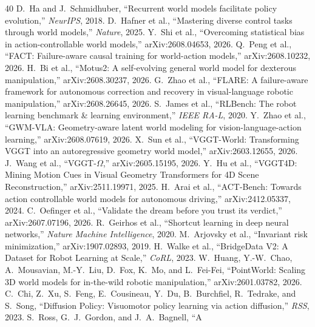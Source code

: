 \documentclass[conference]{IEEEtran}
\begin{document}

\begin{thebibliography}{40}
 D.~Ha and J.~Schmidhuber, ``Recurrent world models
facilitate policy evolution,'' \emph{NeurIPS}, 2018.
 D.~Hafner et al., ``Mastering diverse control
tasks through world models,'' \emph{Nature}, 2025.
 Y.~Shi et al., ``Overcoming statistical bias in
action-controllable world models,'' arXiv:2608.04653, 2026.
 Q.~Peng et al., ``FACT: Failure-aware causal training for
world-action models,'' arXiv:2608.10232, 2026.
 H.~Bi et al., ``Motus2: A self-evolving general world
model for dexterous manipulation,'' arXiv:2608.30237, 2026.
 G.~Zhao et al., ``FLARE: A failure-aware framework for
autonomous correction and recovery in visual-language robotic manipulation,''
arXiv:2608.26645, 2026.
 S.~James et al., ``RLBench: The robot learning benchmark
\& learning environment,'' \emph{IEEE RA-L}, 2020.
 Y.~Zhao et al., ``GWM-VLA: Geometry-aware latent world
modeling for vision-language-action learning,'' arXiv:2608.07619, 2026.
 X.~Sun et al., ``VGGT-World: Transforming VGGT into an
autoregressive geometry world model,'' arXiv:2603.12655, 2026.
 J.~Wang et al., ``VGGT-$\Omega$,'' arXiv:2605.15195,
2026.
 Y.~Hu et al., ``VGGT4D: Mining Motion Cues in Visual
Geometry Transformers for 4D Scene Reconstruction,'' arXiv:2511.19971, 2025.
 H.~Arai et al., ``ACT-Bench: Towards action controllable
world models for autonomous driving,'' arXiv:2412.05337, 2024.
 C.~Oefinger et al., ``Validate the dream before you
trust its verdict,'' arXiv:2607.07196, 2026.
 R.~Geirhos et al., ``Shortcut learning in deep
neural networks,'' \emph{Nature Machine Intelligence}, 2020.
 M.~Arjovsky et al., ``Invariant risk minimization,''
arXiv:1907.02893, 2019.
 H.~Walke et al., ``BridgeData V2: A Dataset for Robot
Learning at Scale,'' \emph{CoRL}, 2023.
 W.~Huang, Y.-W.~Chao, A.~Mousavian, M.-Y.~Liu,
D.~Fox, K.~Mo, and L.~Fei-Fei, ``PointWorld: Scaling 3D world models for
in-the-wild robotic manipulation,'' arXiv:2601.03782, 2026.
 C.~Chi, Z.~Xu, S.~Feng, E.~Cousineau, Y.~Du,
B.~Burchfiel, R.~Tedrake, and S.~Song, ``Diffusion Policy: Visuomotor policy
learning via action diffusion,'' \emph{RSS}, 2023.
 S.~Ross, G.~J.~Gordon, and J.~A.~Bagnell, ``A

\end{thebibliography}
\end{document}
